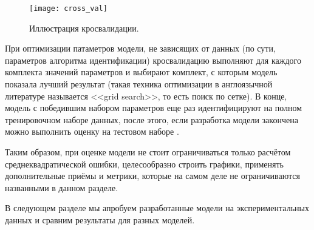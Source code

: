     \begin{figure}[!htp]
        \centering
        \texttt{[image: cross\_val]}
        \caption{Иллюстрация кросвалидации.}
        \label{pic:cross_val}
    \end{figure}

    При оптимизации патаметров модели, не зависящих от данных (по сути, 
    параметров алгоритма идентификации) кросвалидацию выполняют для 
    каждого комплекта значений параметров и выбирают комплект, с которым 
    модель показала лучший результат (такая техника оптимизации в англоязычной 
    литературе называется <<grid search>>, то есть поиск по сетке). В конце,
    модель с победившим набором параметров еще раз идентифицируют на полном
    тренировочном наборе данных, после этого, если разработка модели закончена
    можно выполнить оценку на тестовом наборе \cite{sklearn_cross_validation}.

    Таким образом, при оценке модели не стоит ограничиваться только расчётом
    среднеквадратической ошибки, целесообразно строить графики, применять 
    дополнительные приёмы и метрики, которые на самом деле не ограничиваются
    названными в данном разделе. 

    В следующем разделе мы апробуем разработанные модели на экспериментальных 
    данных и сравним результаты для разных моделей.